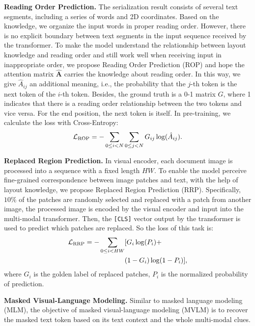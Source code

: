 \documentclass[11pt]{article}
\begin{document}
\noindent\textbf{Reading Order Prediction.}
The serialization result consists of several text segments, including a series of words and 2D coordinates. Based on the knowledge, we organize the input words in proper reading order. 
However, there is no explicit boundary between text segments in the input sequence received by the transformer. 
To make the model understand the relationship between layout knowledge and reading order and still work well when receiving input in inappropriate order, we propose Reading Order Prediction (ROP) and hope the attention matrix $\hat{\textbf{A}}$ carries the knowledge about reading order.
In this way, we give ${\hat{A}_{ij}}$ an additional meaning, i.e., the probability that the $j$-th token is the next token of the $i$-th token.
Besides, the ground truth is a 0-1 matrix $G$, where 1 indicates that there is a reading order relationship between the two tokens and vice versa. For the end position, the next token is itself.
In pre-training, we calculate the loss with Cross-Entropy:
\begin{equation}
    \mathcal{L}_{\rm ROP} = - \sum_{0 \leq i < N} \sum_{0 \leq j < N} G_{ij} \log(\hat{A}_{ij}).
\end{equation}

\noindent\textbf{Replaced Region Prediction.}
In visual encoder, each document image is processed into a sequence with a fixed length $HW$.
To enable the model perceive fine-grained correspondence between image patches and text, with the help of layout knowledge, we propose Replaced Region Prediction (RRP).
Specifically, $10\%$ of the patches are randomly selected and replaced with a patch from another image, the processed image is encoded by the visual encoder and input into the multi-modal transformer. 
Then, the \verb|[CLS]| vector output by the transformer is used to predict which patches are replaced. 
So the loss of this task is:
%
\begin{align}
    \mathcal{L}_{\rm RRP}= - \sum_{0 \leq i < HW} & [ G_i \log(P_i) + \nonumber \\ 
        & (1- G_i)\log(1- P_i)],
\end{align}
%
where $G_i$ is the golden label of replaced patches, $P_i$ is the normalized probability of prediction.

\noindent\textbf{Masked Visual-Language Modeling.}
Similar to masked language modeling (MLM), the objective of masked visual-language modeling (MVLM) is to recover the masked text token based on its text context and the whole multi-modal clues.
\end{document}
